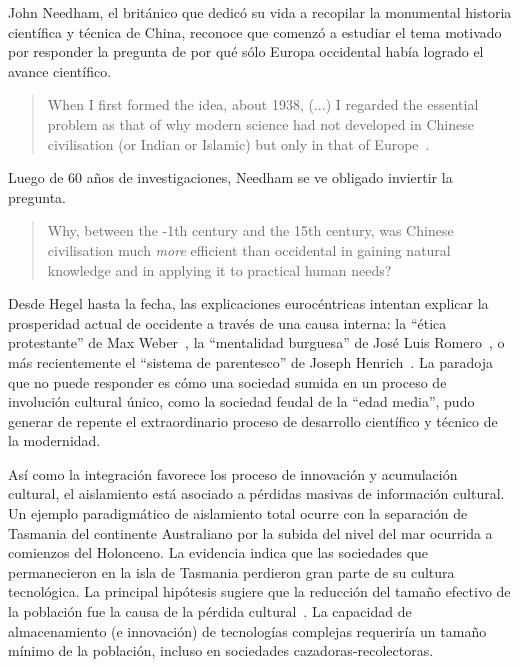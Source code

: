 \documentclass[a4paper,10pt]{book}
\theoremstyle{definition}
\begin{document}
John Needham, el brit\'anico que dedic\'o su vida a recopilar la monumental historia cient\'ifica y t\'ecnica de China, reconoce que comenz\'o a estudiar el tema motivado por responder la pregunta de por qu\'e s\'olo Europa occidental hab\'ia logrado el avance cient\'ifico.
%
\begin{quotation}
When I first formed the idea, about 1938, (...) I regarded the essential problem as that of why modern science had not developed in Chinese civilisation (or Indian or Islamic) but only in that of Europe~\cite{needham2004-generalConclusionsAndReflections}.%
\end{quotation}
Luego de 60 a\~nos de investigaciones, Needham se ve obligado inviertir la pregunta.
\begin{quotation}
Why, between the -1th century and the 15th century, was Chinese civilisation much \emph{more} efficient than occidental in gaining natural knowledge and in applying it to practical human needs?~\cite{needham2004-generalConclusionsAndReflections}
\end{quotation}


Desde Hegel hasta la fecha, las explicaciones euroc\'entricas intentan explicar la prosperidad actual de occidente a trav\'es de una causa interna: la ``\'etica protestante'' de Max Weber~\cite{weber1905-eticaProtestante}, la ``mentalidad burguesa'' de Jos\'e Luis Romero~\cite{romero1967-revolucionBurguesa}, o m\'as recientemente el ``sistema de parentesco'' de Joseph Henrich~\cite{henrich2020-weirdest}.
%
La paradoja que no puede responder es c\'omo una sociedad sumida en un proceso de involuci\'on cultural \'unico, como la sociedad feudal de la ``edad media'', pudo generar de repente el extraordinario proceso de desarrollo cient\'ifico y t\'ecnico de la modernidad.


As\'i como la integraci\'on favorece los proceso de innovaci\'on y acumulaci\'on cultural, el aislamiento está asociado a p\'erdidas masivas de informaci\'on cultural.
%
Un ejemplo paradigm\'atico de aislamiento total ocurre con la separaci\'on de Tasmania del continente Australiano por la subida del nivel del mar ocurrida a comienzos del Holonceno.
%
La evidencia indica que las sociedades que permanecieron en la isla de Tasmania perdieron gran parte de su cultura tecnol\'ogica.
%
La principal hip\'otesis sugiere que la reducci\'on del tama\~no efectivo de la poblaci\'on fue la causa de la p\'erdida cultural~\cite{Henrich2004}.
%
La capacidad de almacenamiento (e innovaci\'on) de tecnolog\'ias complejas requeriría un tama\~no m\'inimo de la poblaci\'on, incluso en sociedades cazadoras-recolectoras.
\end{document}
